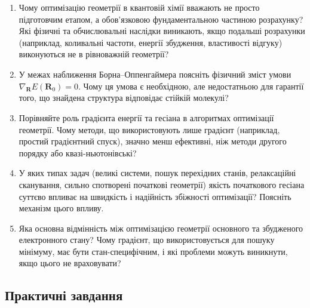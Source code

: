 \begin{enumerate}
    \item Чому оптимізацію геометрії в квантовій хімії вважають не просто підготовчим етапом, а обов’язковою фундаментальною частиною розрахунку? Які фізичні та обчислювальні наслідки виникають, якщо подальші розрахунки (наприклад, коливальні частоти, енергії збудження, властивості відгуку) виконуються не в рівноважній геометрії?

    \item У межах наближення Борна–Оппенгаймера поясніть фізичний зміст умови $\nabla_{\mathbf{R}} E(\mathbf{R}_0) = 0$. Чому ця умова є необхідною, але недостатньою для гарантії того, що знайдена структура відповідає стійкій молекулі?

    \item Порівняйте роль градієнта енергії та гесіана в алгоритмах оптимізації геометрії. Чому методи, що використовують лише градієнт (наприклад, простий градієнтний спуск), значно менш ефективні, ніж методи другого порядку або квазі-ньютонівські?

    \item У яких типах задач (великі системи, пошук перехідних станів, релаксаційні сканування, сильно спотворені початкові геометрії) якість початкового гесіана суттєво впливає на швидкість і надійність збіжності оптимізації? Поясніть механізм цього впливу.

    \item Яка основна відмінність між оптимізацією геометрії основного та збудженого електронного стану? Чому градієнт, що використовується для пошуку мінімуму, має бути стан-специфічним, і які проблеми можуть виникнути, якщо цього не враховувати?
\end{enumerate}


\subsection*{Практичні завдання}

